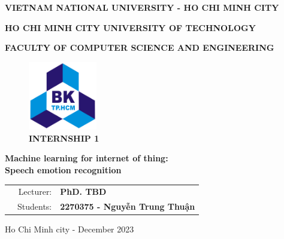 \begin{titlepage}
\centerline{\bf \normalsize VIETNAM NATIONAL UNIVERSITY - HO CHI MINH CITY}
\centerline{\bf \normalsize HO CHI MINH CITY UNIVERSITY OF TECHNOLOGY}
\centerline{\bf \normalsize FACULTY OF COMPUTER SCIENCE AND ENGINEERING}
\vspace*{1cm}
\begin{figure}[h!]
	\begin{center}
		\includegraphics[width=3cm]{image/bku.png}
		\\
		\vspace{.5cm}
		\LARGE \textbf{INTERNSHIP 1}
	\end{center}
\end{figure}

\begin{center}
    \LARGE \textbf{Machine learning for internet of thing:\\Speech emotion recognition} \\
\end{center}

\vspace{3em}

\begin{table}[h]
\begin{tabular}{rrl}
\hspace{2.5 cm} & Lecturer: & \bf PhD. TBD\\
& Students:  & \bf 2270375 - Nguyễn Trung Thuận\\
\end{tabular}
\end{table}

\vspace{2.5em}

\vfill
\begin{center}
	{\normalsize Ho Chi Minh city - December 2023}
\end{center}
\end{titlepage}


\newpage

\thispagestyle{empty}